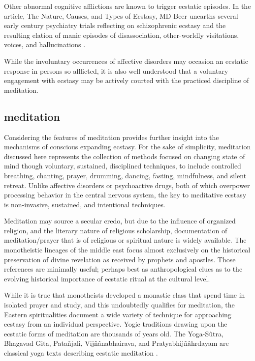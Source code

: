 \documentclass{UIdahoMastersThesis}
\begin{document}
Other abnormal cognitive afflictions are known to trigger ecstatic episodes. In the article, The Nature, Causes, and Types of Ecstasy, MD Beer unearths several early  century psychiatry trials reflecting on schizophrenic ecstasy and the resulting elation of manic episodes of disassociation, other-worldly visitations, voices, and hallucinations \cite{beer_nature_2000}.

While the involuntary occurrences of affective disorders may occasion an ecstatic response in persons so afflicted, it is also well understood that a voluntary engagement with ecstasy may be actively courted with the practiced discipline of meditation.

\subsection{meditation}
Considering the features of meditation provides further insight into the mechanisms of conscious expanding ecstasy. For the sake of simplicity, meditation discussed here represents the collection of methods focused on changing state of mind though voluntary, sustained, disciplined techniques, to include controlled breathing, chanting, prayer, drumming, dancing, fasting, mindfulness, and silent retreat. Unlike affective disorders or psychoactive drugs, both of which overpower processing behavior in the central nervous system, the key to meditative ecstasy is non-invasive, sustained, and intentional techniques.

Meditation may source a secular credo, but due to the influence of organized religion, and the literary nature of religious scholarship, documentation of meditation/prayer that is of religious or spiritual nature is widely available. The monotheistic lineages of the middle east focus almost exclusively on the historical preservation of divine revelation as received by prophets and apostles. Those references are minimally useful; perhaps best as anthropological clues as to the evolving historical importance of ecstatic ritual at the cultural level.
 
While it is true that monotheists developed a monastic class that spend time in isolated prayer and study, and this undoubtedly qualifies for meditation, the Eastern spiritualities document a wide variety of technique for approaching ecstasy from an individual perspective. Yogic traditions drawing upon the ecstatic forms of meditation are thousands of years old. The Yoga-S\^{u}tra, Bhagavad Gita, Pata\~{n}jali, Vij\~{n}\^{a}nabhairava, and Pratyabhij\~{n}\^{a}hrdayam are classical yoga texts describing ecstatic meditation \cite{waelde_dissociation_2004}.
\end{document}
